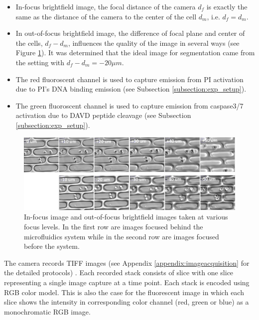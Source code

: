 \documentclass[pdftex,12pt,a4paper]{report}
\begin{document}
\begin{itemize}
\item In-focus brightfield image, the focal distance of the camera $d_f$ is exactly the same as the distance of the camera to the center of the cell $d_m$, i.e. $d_f = d_m$.

\item In out-of-focus brightfield image, the difference of focal plane and center of the cells, $d_f - d_m$, influences the quality of the image in several ways (see Figure \ref{fig:focustest}). It was determined that the ideal image for segmentation came from the setting with $d_f - d_m = -20 \mu m$.

\item The red fluoroscent channel is used to capture emission from PI activation due to PI's DNA binding emission (see Subsection \ref{subsection:exp_setup}).

\item The green fluoroscent channel is used to capture emission from caspase3/7 activation due to DAVD peptide cleavage (see Subsection \ref{subsection:exp_setup}).
\end{itemize}

\begin{figure}[H]
\centering
\includegraphics[width=\textwidth]{images/focus/pict.pdf}
\caption[Effect on focal plane on out-of-focus image]{In-focus image and out-of-focus brightfield images taken at various focus levels.  In the first row are images focused behind the microfluidics system while in the second row are images focused before the system.}
\label{fig:focustest}
\end{figure}

The camera records TIFF images (see Appendix \ref{appendix:imageacquisition} for the detailed protocols) \cite{loc2006tiff}. Each recorded stack consists of slice with one slice representing a single image capture at a time point. Each stack is encoded using RGB color model. This is also the case for the fluorescent image in which each slice shows the intensity in corresponding color channel (red, green or blue) as a monochromatic RGB image.
\end{document}
